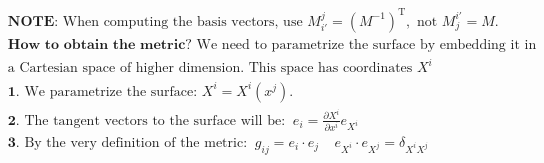 \begin{align*}
&\textbf{NOTE:} 
\text{ When computing the basis vectors, use } M^j_{i'} = (M^{-1})^\mathrm{T}, \text{ not } M^{i'}_j = M.\\
&\textbf{How to obtain the metric?} \text{ We need to parametrize the surface by embedding it in} \\
&\text{a Cartesian space of higher dimension. This space has coordinates } X^i \\
&\textbf{1.} \text{ We parametrize the surface: }X^i = X^i(x^j). \\
&\textbf{2.} \text{ The tangent vectors to the surface will be:} \;\;  e_i = \tfrac{\partial X^i}{\partial x^i} e_{X^i} \\
&\textbf{3.} \text{ By the very definition of the metric:} \;\;  g_{ij} = e_i \cdot e_j \;\; \;\; e_{X^i}\cdot e_{X^j} = \delta_{X^iX^j}
\end{align*}

